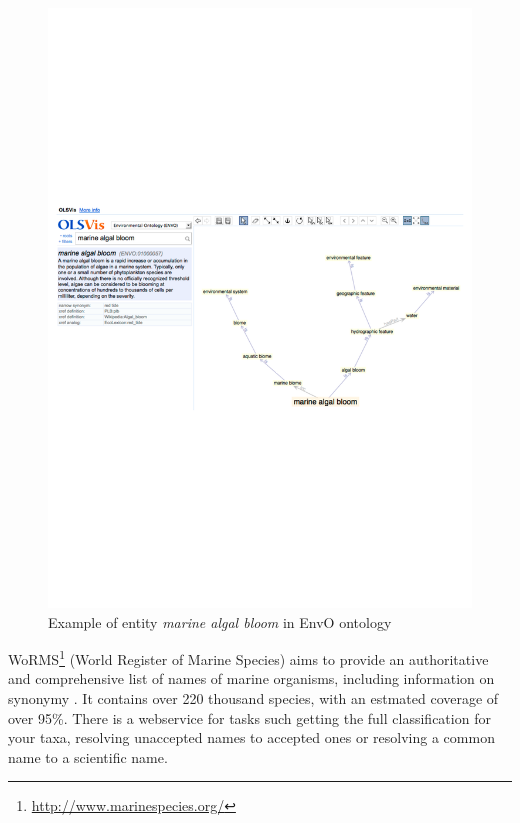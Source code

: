\begin{figure}
\begin{center}
\includegraphics[scale=0.6]{figures/envo-example.pdf}
 \caption{Example of entity \emph{marine algal bloom} in EnvO ontology}
\label{fig:envo-example}
\end{center}
\end{figure}


WoRMS\footnote{\url{http://www.marinespecies.org/}}  (World Register of Marine Species) aims to provide an authoritative and comprehensive list of names of marine organisms, including information on synonymy \citep{Costello2013Global}.
It contains over 220 thousand species, with an estmated coverage of over 95\%.
There is a webservice for tasks such getting the full classification for your taxa, resolving unaccepted names to accepted ones or resolving a common name to a scientific name.

